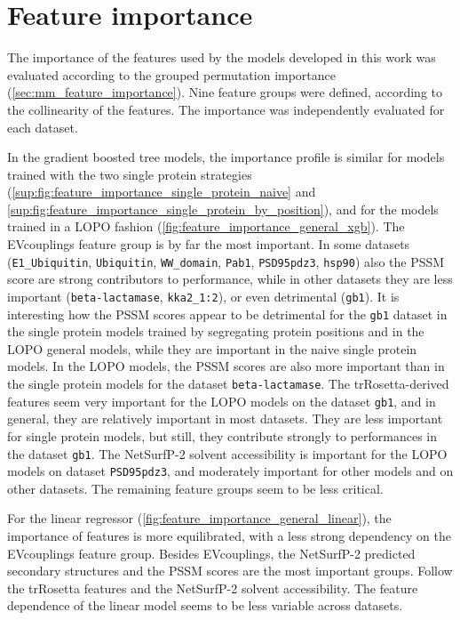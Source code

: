 \section{Feature importance}\label{sec:res:feature_imp}
The importance of the features used by the models developed in this work was evaluated according to the grouped permutation importance (\autoref{sec:mm_feature_importance}).
Nine feature groups were defined, according to the collinearity of the features.
The importance was independently evaluated for each dataset.

In the gradient boosted tree models, the importance profile is similar for models trained with the two single protein strategies (\autoref{sup:fig:feature_importance_single_protein_naive} and \autoref{sup:fig:feature_importance_single_protein_by_position}), and for the models trained in a LOPO fashion (\autoref{fig:feature_importance_general_xgb}).
The EVcouplings feature group is by far the most important.
In some datasets (\texttt{E1\_Ubiquitin}, \texttt{Ubiquitin}, \texttt{WW\_domain}, \texttt{Pab1}, \texttt{PSD95pdz3}, \texttt{hsp90}) also the PSSM score are strong contributors to performance, while in other datasets they are less important (\texttt{beta-lactamase}, \texttt{kka2\_1:2}), or even detrimental (\texttt{gb1}).
It is interesting how the PSSM scores appear to be detrimental for the \texttt{gb1} dataset in the single protein models trained by segregating protein positions and in the LOPO general models, while they are important in the naive single protein models.
In the LOPO models, the PSSM scores are also more important than in the single protein models for the dataset \texttt{beta-lactamase}.
The trRosetta-derived features seem very important for the LOPO models on the dataset \texttt{gb1}, and in general, they are relatively important in most datasets.
They are less important for single protein models, but still, they contribute strongly to performances in the dataset \texttt{gb1}.
The NetSurfP-2 solvent accessibility is important for the LOPO models on dataset \texttt{PSD95pdz3}, and moderately important for other models and on other datasets.
The remaining feature groups seem to be less critical.

For the linear regressor (\autoref{fig:feature_importance_general_linear}), the importance of features is more equilibrated, with a less strong dependency on the EVcouplings feature group.
Besides EVcouplings, the NetSurfP-2 predicted secondary structures and the PSSM scores are the most important groups.
Follow the trRosetta features and the NetSurfP-2 solvent accessibility.
The feature dependence of the linear model seems to be less variable across datasets.

